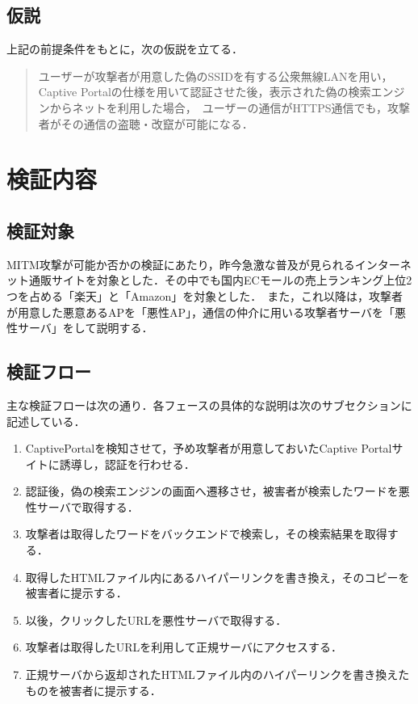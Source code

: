 \documentclass[dvipdfmx]{jsarticle}
\begin{document}
        \subsection{仮説}
            上記の前提条件をもとに，次の仮説を立てる．
            \begin{quote}
                ユーザーが攻撃者が用意した偽のSSIDを有する公衆無線LANを用い，Captive Portalの仕様を用いて認証させた後，表示された偽の検索エンジンからネットを利用した場合，\
                ユーザーの通信がHTTPS通信でも，攻撃者がその通信の盗聴・改竄が可能になる．
            \end{quote}
    \section{検証内容}
        \subsection{検証対象}
            MITM攻撃が可能か否かの検証にあたり，昨今急激な普及が見られるインターネット通販サイトを対象とした．その中でも国内ECモールの売上ランキング上位2つを占める「楽天」と「Amazon」を対象とした．\
            また，これ以降は，攻撃者が用意した悪意あるAPを「悪性AP」，通信の仲介に用いる攻撃者サーバを「悪性サーバ」をして説明する．
        \subsection{検証フロー}
            主な検証フローは次の通り．各フェースの具体的な説明は次のサブセクションに記述している．
            \begin{enumerate}
                \item CaptivePortalを検知させて，予め攻撃者が用意しておいたCaptive Portalサイトに誘導し，認証を行わせる．
                \item 認証後，偽の検索エンジンの画面へ遷移させ，被害者が検索したワードを悪性サーバで取得する．
                \item 攻撃者は取得したワードをバックエンドで検索し，その検索結果を取得する．
                \item 取得したHTMLファイル内にあるハイパーリンクを書き換え，そのコピーを被害者に提示する．
                \item 以後，クリックしたURLを悪性サーバで取得する．
                \item 攻撃者は取得したURLを利用して正規サーバにアクセスする．
                \item 正規サーバから返却されたHTMLファイル内のハイパーリンクを書き換えたものを被害者に提示する．
            \end{enumerate}
\end{document}
